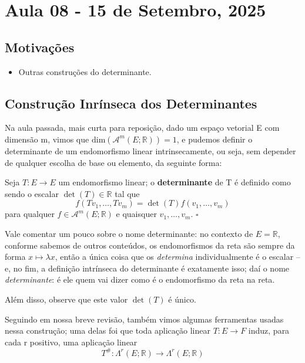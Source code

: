 \documentclass[../differential_forms.tex]{subfiles}
\begin{document}
\section{Aula 08 - 15 de Setembro, 2025}
\subsection{Motivações}
\begin{itemize}
	\item Outras construções do determinante.
\end{itemize}
\subsection{Construção Inrínseca dos Determinantes}
Na aula passada, mais curta para reposição, dado um espaço vetorial E com dimensão m, vimos que \(\mathrm{dim}(\mathcal{A}^{m}(E; \mathbb{R}))=1\),
e pudemos definir o determinante de um endomorfismo linear intrinsecamente, ou seja, sem depender de qualquer escolha de base ou elemento,
da seguinte forma:
\begin{def*}
	Seja \(T:E\rightarrow E\) um endomorfismo linear; o \textbf{determinante} de T é definido como sendo o escalar \(\det{(T)}\in \mathbb{R}\) tal que
	\[
		f(Tv_1, \dotsc , Tv_{m}) = \det{(T)} f(v_1, \dotsc , v_{m})
	\]
	para qualquer \(f\in \mathcal{A}^{m}(E; \mathbb{R})\) e quaisquer \(v_1, \dotsc , v_m\). \(\square\)
\end{def*}
\begin{tcolorbox}[
		skin=enhanced,
		title=Observação,
		fonttitle=\bfseries,
		colframe=black,
		colbacktitle=cyan!75!white,
		colback=cyan!15,
		colbacklower=black,
		coltitle=black,
		drop fuzzy shadow,
	]
	Vale comentar um pouco sobre o nome determinante: no contexto de \(E = \mathbb{R}\), conforme sabemos de outros conteúdos, os endomorfismos da reta são sempre da forma
	\(x\mapsto \lambda x\), então a única coisa que os \textit{determina} individualmente é o escalar -- e, no fim, a definição intrínseca do determinante
	é exatamente isso; daí o nome \textit{determinante}: é ele quem vai dizer como é o endomorfismo da reta na reta.

	Além disso, observe que este valor \(\det{(T)}\) é único.
\end{tcolorbox}
Seguindo em nossa breve revisão, também vimos algumas ferramentas usadas nessa construção; uma delas foi que toda aplicação linear \(T:E\rightarrow F\) induz, para cada r positivo, uma aplicação linear
\[
	T^{\#}: \Lambda^{r}(E; \mathbb{R})\rightarrow \Lambda^{r}(E; \mathbb{R})
\]
\end{document}
